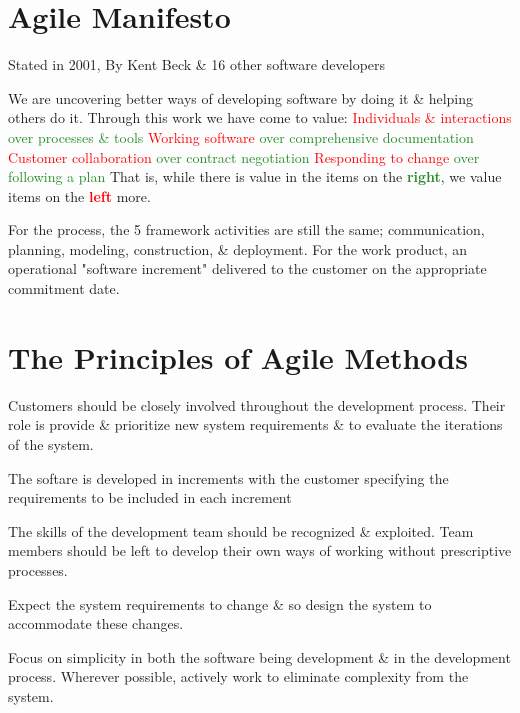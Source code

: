 \documentclass{report}
\newcommand{\textr}[1]{\textcolor{red}{#1}}
\newcommand{\textg}[1]{\textcolor{ForestGreen}{#1}}
\newcommand{\textbfr}[1]{\textbf{\textr{#1}}}
\newcommand{\textbfg}[1]{\textbf{\textg{#1}}}
\begin{document}
\section{Agile Manifesto}
\noindent Stated in 2001, By Kent Beck \& 16 other software developers\newline

\noindent We are uncovering better ways of developing software by doing it \& helping others do it. Through this work we have come to value:\newline
\indent\textr{Individuals \& interactions} \textg{over processes \& tools} \newline
\indent\textr{Working software} \textg{over comprehensive documentation} \newline
\indent\textr{Customer collaboration} \textg{over contract negotiation}\newline
\indent\textr{Responding to change} \textg{over following a plan}\newline
That is, while there is value in the items on the \textbfg{right}, we value items on the \textbfr{left} more.\newline

\noindent For the process, the 5 framework activities are still the same; communication, planning, modeling, construction, \& deployment. For the work product, an operational "software increment" delivered to the customer on the appropriate commitment date.

\section{The Principles of Agile Methods}
\begin{description}[style=multiline,leftmargin=12em]
  \item [Customer involvement] Customers should be closely involved throughout the development process. Their role is provide \& prioritize new system requirements \& to evaluate the iterations of the system.
  \item [Incremental delivery] The softare is developed in increments with the customer specifying the requirements to be included in each increment
  \item [People not process] The skills of the development team should be recognized \& exploited. Team members should be left to develop their own ways of working without prescriptive processes.
  \item [Embrace change] Expect the system requirements to change \& so design the system to accommodate these changes.
  \item [Maintain simplicity] Focus on simplicity in both the software being development \& in the development process. Wherever possible, actively work to eliminate complexity from the system.
\end{description}
\end{document}
